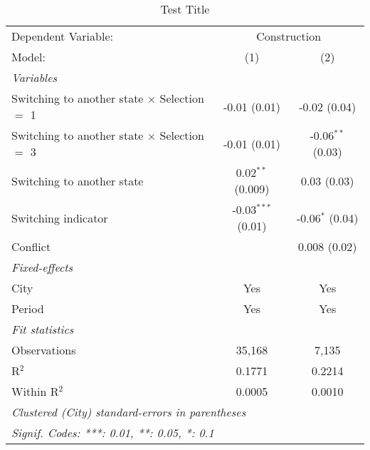 \begin{table}[htbp]
   \caption{Test Title}
   \centering
   \begin{tabular}{lcc}
      \tabularnewline \midrule \midrule
      Dependent Variable: & \multicolumn{2}{c}{Construction}\\
      Model:                                               & (1)                  & (2)\\  
      \midrule
      \emph{Variables}\\
      Switching to another state $\times$ Selection $=$ 1  & -0.01 (0.01)         & -0.02 (0.04)\\   
      Switching to another state $\times$ Selection $=$ 3  & -0.01 (0.01)         & -0.06$^{**}$ (0.03)\\   
      Switching to another state                           & 0.02$^{**}$ (0.009)  & 0.03 (0.03)\\   
      Switching indicator                                  & -0.03$^{***}$ (0.01) & -0.06$^{*}$ (0.04)\\   
      Conflict                                             &                      & 0.008 (0.02)\\   
      \midrule
      \emph{Fixed-effects}\\
      City                                                 & Yes                  & Yes\\  
      Period                                               & Yes                  & Yes\\  
      \midrule
      \emph{Fit statistics}\\
      Observations                                         & 35,168               & 7,135\\  
      R$^2$                                                & 0.1771               & 0.2214\\  
      Within R$^2$                                         & 0.0005               & 0.0010\\  
      \midrule \midrule
      \multicolumn{3}{l}{\emph{Clustered (City) standard-errors in parentheses}}\\
      \multicolumn{3}{l}{\emph{Signif. Codes: ***: 0.01, **: 0.05, *: 0.1}}\\
   \end{tabular}
\end{table}
